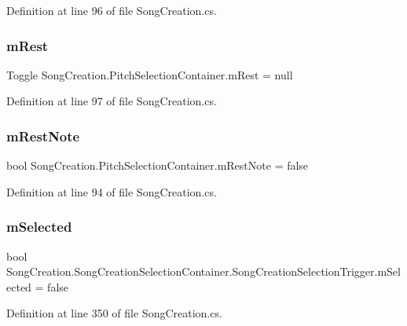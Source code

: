 Definition at line 96 of file Song\+Creation.\+cs.

\mbox{\label{group___s_c_handlers_ga41e99d322cb92a3eb304bef704af2b7a}} 
\subsubsection{\texorpdfstring{m\+Rest}{mRest}}
{\footnotesize\ttfamily Toggle Song\+Creation.\+Pitch\+Selection\+Container.\+m\+Rest = null\hspace{0.3cm}{\ttfamily [private]}}



Definition at line 97 of file Song\+Creation.\+cs.

\mbox{\label{group___s_c_handlers_gace289a908db9ba443c50ec8656ae05b1}} 
\subsubsection{\texorpdfstring{m\+Rest\+Note}{mRestNote}}
{\footnotesize\ttfamily bool Song\+Creation.\+Pitch\+Selection\+Container.\+m\+Rest\+Note = false\hspace{0.3cm}{\ttfamily [private]}}



Definition at line 94 of file Song\+Creation.\+cs.

\mbox{\label{group___s_c_handlers_ga49ffd4516ec7982b1683a44b4f22de74}} 
\subsubsection{\texorpdfstring{m\+Selected}{mSelected}}
{\footnotesize\ttfamily bool Song\+Creation.\+Song\+Creation\+Selection\+Container.\+Song\+Creation\+Selection\+Trigger.\+m\+Selected = false\hspace{0.3cm}{\ttfamily [private]}}



Definition at line 350 of file Song\+Creation.\+cs.

